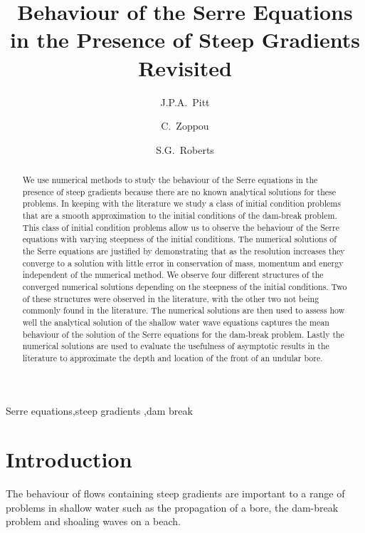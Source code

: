 \documentclass[times]{elsarticle}
\begin{document}
\title{Behaviour of the Serre Equations in the Presence of Steep Gradients Revisited}

\author[ANU]{J.P.A.~Pitt}
\author[ANU]{C.~Zoppou}
\author[ANU]{S.G.~Roberts}

\address[ANU]{Mathematical Sciences Institute, Australian National University, Canberra, ACT 0200, Australia}
 \begin{abstract}
 We use numerical methods to study the behaviour of the Serre equations in the presence of steep gradients because there are no known analytical solutions for these problems. In keeping with the literature we study a class of initial condition problems that are a smooth approximation to the initial conditions of the dam-break problem. This class of initial condition problems allow us to observe the behaviour of the Serre equations with varying steepness of the initial conditions. The numerical solutions of the Serre equations are justified by demonstrating that as the resolution increases they converge to a solution with little error in conservation of mass, momentum and energy independent of the numerical method. We observe four different structures of the converged numerical solutions depending on the steepness of the initial conditions. Two of these structures were observed in the literature, with the other two not being commonly found in the literature. The numerical solutions are then used to assess how well the analytical solution of the shallow water wave equations captures the mean behaviour of the solution of the Serre equations for the dam-break problem. Lastly the numerical solutions are used to evaluate the usefulness of asymptotic results in the literature to approximate the depth and location of the front of an undular bore.
 \end{abstract}	
 
  \begin{keyword}
  	Serre equations\sep steep gradients \sep dam break
  \end{keyword}
  
 \maketitle
\linenumbers
\section{Introduction} \label{intro} 
The behaviour of flows containing steep gradients are important to a range of problems in shallow water such as the propagation of a bore, the dam-break problem and shoaling waves on a beach.
\end{document}
